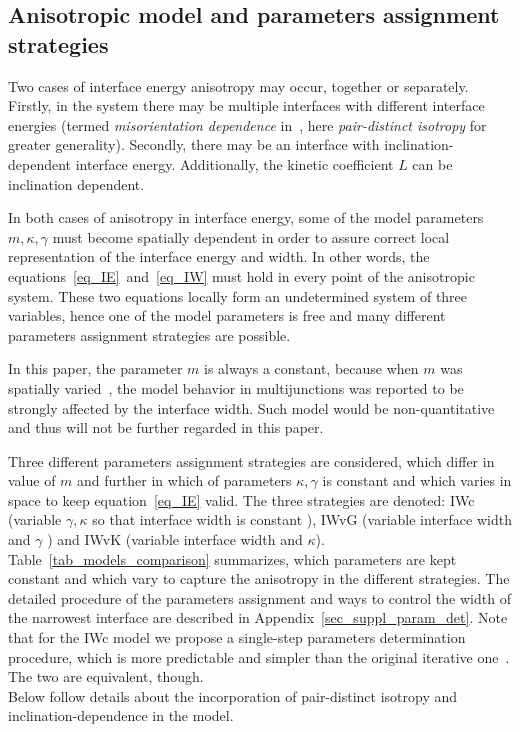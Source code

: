 	\subsection{Anisotropic model and parameters assignment strategies}
	Two cases of interface energy anisotropy may occur, together or separately. Firstly, in the system there may be multiple interfaces with different interface energies (termed \textit{misorientation dependence} in~\cite{Moelans2008}, here \textit{pair-distinct isotropy} for greater generality). Secondly, there may be an interface with inclination-dependent interface energy. Additionally, the kinetic coefficient $L$ can be inclination dependent. 
	
	In both cases of anisotropy in interface energy, some of the model parameters $m,\kappa, \gamma$ must become spatially dependent in order to assure correct local representation of the interface energy and width. In other words, the equations~\eqref{eq_IE}~and~\eqref{eq_IW} must hold in every point of the anisotropic system.
	These two equations locally form an undetermined system of three variables, hence one of the model parameters is free and many different parameters assignment strategies are possible.
	
	In this paper, the parameter $m$ is always a constant, because when $m$ was spatially varied~\cite{Moelans2008}, the model behavior in multijunctions was reported to be strongly affected by the interface width. Such model would be non-quantitative and thus will not be further regarded in this paper.
	
	Three different parameters assignment strategies are considered, which differ in value of $m$ and further in which of parameters $\kappa,\gamma$ is constant and which varies in space to keep equation~\eqref{eq_IE} valid. The three strategies are denoted: IWc (variable $\gamma,\kappa$ so that interface width is constant  \cite{Moelans2008}), IWvG (variable interface width and $\gamma$ \cite{Ravash2017}) and IWvK (variable interface width and $\kappa$).   Table~\ref{tab_models_comparison} summarizes, which parameters are kept constant and which vary to capture the anisotropy in the different strategies. The detailed procedure of the parameters assignment and ways to control the width of the narrowest interface are described in Appendix~\ref{sec_suppl_param_det}. Note that for the IWc model we propose a single-step parameters determination procedure, which is more predictable and simpler than the original iterative one~\cite{Moelans2008}. The two are equivalent, though.\\
	Below follow details about the incorporation of pair-distinct isotropy and inclination-dependence in the model. 
	
